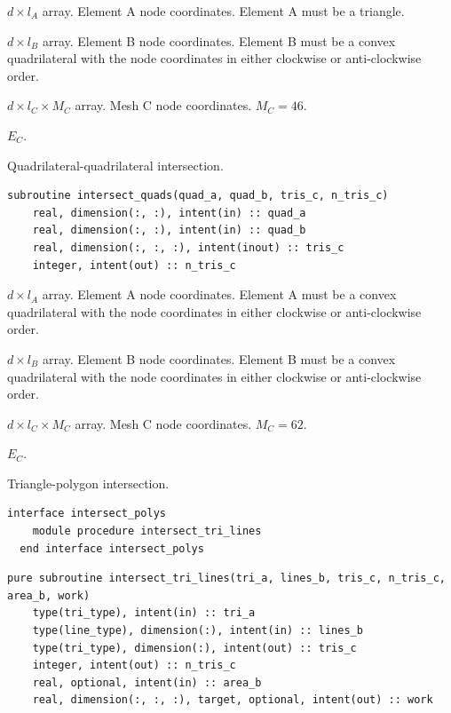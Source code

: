 \documentclass{article}
\begin{document}
\begin{description}[font=\ttfamily\bfseries,leftmargin=2.2\parindent,labelindent=1.7\parindent,noitemsep]
  \item[tri\_a] $d \times l_A$ array. Element A node coordinates. Element A
    must be a triangle.
  \item[quad\_b] $d \times l_B$ array. Element B node coordinates. Element B
    must be a convex quadrilateral with the node coordinates in either clockwise
    or anti-clockwise order.
  \item[tris\_c] $d \times l_C \times M_C$ array. Mesh C node coordinates.
    $M_C = 46$.
  \item[n\_tris\_c] $E_C$.
\end{description}

\noindent Quadrilateral-quadrilateral intersection.

\begin{lstlisting}[language=FORTRAN]
  subroutine intersect_quads(quad_a, quad_b, tris_c, n_tris_c)
    real, dimension(:, :), intent(in) :: quad_a
    real, dimension(:, :), intent(in) :: quad_b
    real, dimension(:, :, :), intent(inout) :: tris_c
    integer, intent(out) :: n_tris_c
\end{lstlisting}

\begin{description}[font=\ttfamily\bfseries,leftmargin=2.2\parindent,labelindent=1.7\parindent,noitemsep]
  \item[quad\_a] $d \times l_A$ array. Element A node coordinates. Element A
    must be a convex quadrilateral with the node coordinates in either clockwise
    or anti-clockwise order.
  \item[quad\_b] $d \times l_B$ array. Element B node coordinates. Element B
    must be a convex quadrilateral with the node coordinates in either clockwise
    or anti-clockwise order.
  \item[tris\_c] $d \times l_C \times M_C$ array. Mesh C node coordinates.
    $M_C = 62$.
  \item[n\_tris\_c] $E_C$.
\end{description}

\noindent Triangle-polygon intersection.
  
\begin{lstlisting}[language=FORTRAN]
  interface intersect_polys
    module procedure intersect_tri_lines
  end interface intersect_polys
\end{lstlisting}

\begin{lstlisting}[language=FORTRAN]
  pure subroutine intersect_tri_lines(tri_a, lines_b, tris_c, n_tris_c, area_b, work)
    type(tri_type), intent(in) :: tri_a
    type(line_type), dimension(:), intent(in) :: lines_b
    type(tri_type), dimension(:), intent(out) :: tris_c
    integer, intent(out) :: n_tris_c
    real, optional, intent(in) :: area_b
    real, dimension(:, :, :), target, optional, intent(out) :: work
\end{lstlisting}
\end{document}
